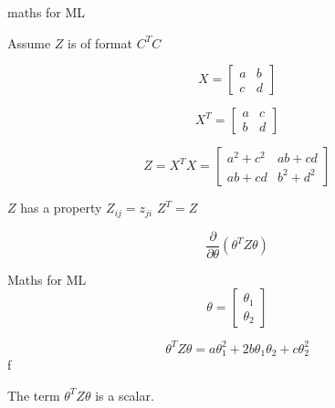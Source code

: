 \documentclass{beamer}
\begin{document}
\begin{frame}{maths for ML}


Assume $Z$ is of format $C^{T}C$

\begin{equation*}
    X = \begin{bmatrix}
    a&b\\
    c&d
    \end{bmatrix}
\end{equation*}

\begin{equation*}
    X^{T} = \begin{bmatrix}
    a&c\\
    b&d
    \end{bmatrix}
\end{equation*}

\begin{equation*}
    Z = X^{T}X =  \begin{bmatrix}
    a^{2}+c^{2}&ab+cd\\
    ab+cd&b^{2}+d^{2}
    \end{bmatrix}
\end{equation*}

$Z$ has a property $Z_{ij}=z_{ji}$ \implies $Z^{T}=Z$

\begin{equation*}
    \frac{\partial}{ \partial \theta} (\theta^{T}Z\theta)
\end{equation*}
    
\end{frame}


\begin{frame}{Maths for ML}
    \begin{equation*}
        \theta = \begin{bmatrix}
        \theta_{1}\\
        \theta_{2}
        \end{bmatrix}
    \end{equation*}
    
    \begin{equation*}
        \theta^{T}Z\theta = a\theta_{1}^{2} + 2b\theta_{1}\theta_{2}+c\theta_{2}^{2} 
    \end{equation*}f

The term $\theta^{T}Z\theta$ is a scalar.

\end{frame}
\end{document}
